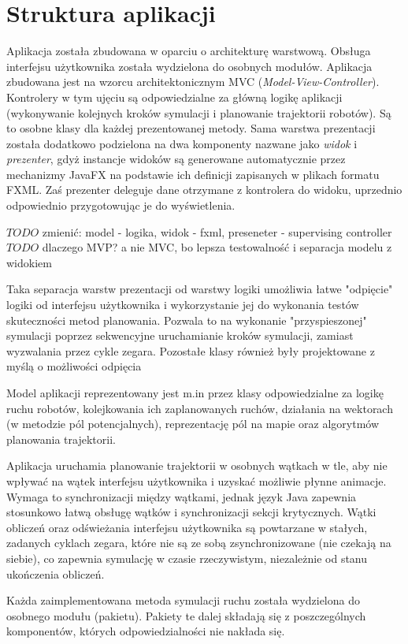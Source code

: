 \section{Struktura aplikacji}
Aplikacja została zbudowana w oparciu o architekturę warstwową. Obsługa interfejsu użytkownika została wydzielona do osobnych modułów.
Aplikacja zbudowana jest na wzorcu architektonicznym MVC ({\it Model-View-Controller}).
Kontrolery w tym ujęciu są odpowiedzialne za główną logikę aplikacji (wykonywanie kolejnych kroków symulacji i planowanie trajektorii robotów). Są to osobne klasy dla każdej prezentowanej metody.
Sama warstwa prezentacji została dodatkowo podzielona na dwa komponenty nazwane jako {\it widok} i {\it prezenter}, gdyż instancje widoków są generowane automatycznie przez mechanizmy JavaFX na podstawie ich definicji zapisanych w plikach formatu FXML. Zaś prezenter deleguje dane otrzymane z kontrolera do widoku, uprzednio odpowiednio przygotowując je do wyświetlenia.

$TODO$ zmienić: model - logika, widok - fxml, preseneter - supervising controller
$TODO$ dlaczego MVP? a nie MVC, bo lepsza testowalność i separacja modelu z widokiem

Taka separacja warstw prezentacji od warstwy logiki umożliwia łatwe "odpięcie" logiki od interfejsu użytkownika i wykorzystanie jej do wykonania testów skuteczności metod planowania. Pozwala to na wykonanie "przyspieszonej" symulacji poprzez sekwencyjne uruchamianie kroków symulacji, zamiast wyzwalania przez cykle zegara. Pozostałe klasy również były projektowane z myślą o możliwości odpięcia

Model aplikacji reprezentowany jest m.in przez klasy odpowiedzialne za logikę ruchu robotów, kolejkowania ich zaplanowanych ruchów, działania na wektorach (w metodzie pól potencjalnych), reprezentację pól na mapie oraz algorytmów planowania trajektorii.

Aplikacja uruchamia planowanie trajektorii w osobnych wątkach w tle, aby nie wpływać na wątek interfejsu użytkownika i uzyskać możliwie płynne animacje. Wymaga to synchronizacji między wątkami, jednak język Java zapewnia stosunkowo łatwą obsługę wątków i synchronizacji sekcji krytycznych. Wątki obliczeń oraz odświeżania interfejsu użytkownika są powtarzane w stałych, zadanych cyklach zegara, które nie są ze sobą zsynchronizowane (nie czekają na siebie), co zapewnia symulację w czasie rzeczywistym, niezależnie od stanu ukończenia obliczeń.

Każda zaimplementowana metoda symulacji ruchu została wydzielona do osobnego modułu (pakietu). Pakiety te dalej składają się z poszczególnych komponentów, których odpowiedzialności nie nakłada się.

